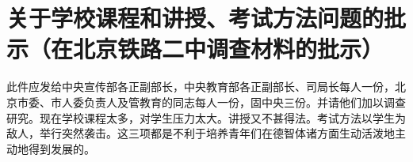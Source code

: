 \section[关于学校课程和讲授、考试方法问题的批示（在北京铁路二中调查材料的批示）（一九六四年三月十日）]{关于学校课程和讲授、考试方法问题的批示（在北京铁路二中调查材料的批示）}


此件应发给中央宣传部各正副部长，中央教育部各正副部长、司局长每人一份，北京市委、市人委负责人及管教育的同志每人一份，固中央三份。并请他们加以调查研究。现在学校课程太多，对学生压力太大。讲授又不甚得法。考试方法以学生为敌人，举行突然袭击。这三项都是不利于培养青年们在德智体诸方面生动活泼地主动地得到发展的。



